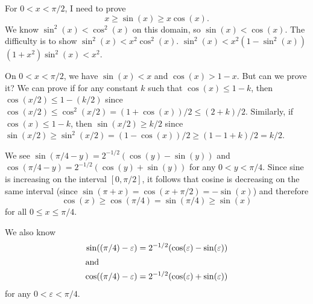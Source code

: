 For $0 < x < \pi/2$, I need to prove
\begin{equation}
x\geq \sin(x)\geq x\cos(x).
\end{equation}
We know $\sin^{2}(x) < \cos^{2}(x)$ on this domain, so $\sin(x) < \cos(x)$.
The difficulty is to show $\sin^{2}(x) < x^{2}\cos^{2}(x)$.
$\sin^{2}(x) < x^{2}(1 - \sin^{2}(x))$
$(1 + x^{2})\sin^{2}(x) < x^{2}$.

On $0 < x < \pi/2$, we have $\sin(x) < x$ and $\cos(x) > 1 - x$.
But can we prove it? We can prove if for any constant $k$ such that
$\cos(x)\leq 1 - k$, then $\cos(x/2)\leq 1 - (k/2)$ since
$\cos(x/2)\leq\cos^{2}(x/2) = (1 + \cos(x))/2 \leq (2 + k)/2$.
Similarly, if $\cos(x)\leq 1 - k$, then $\sin(x/2)\geq k/2$ since
$\sin(x/2)\geq\sin^{2}(x/2) = (1 - \cos(x))/2\geq (1 - 1 + k)/2 = k/2$.

We see $\sin(\pi/4 - y) = 2^{-1/2}(\cos(y) - \sin(y))$ and
$\cos(\pi/4 - y) = 2^{-1/2}(\cos(y) + \sin(y))$ for any $0<y<\pi/4$.
Since sine is increasing on the interval $[0,\pi/2]$, it follows that
cosine is decreasing on the same interval (since
$\sin(\pi + x) = \cos(x + \pi/2) = -\sin(x)$) and therefore
\begin{equation}
\cos(x)\geq\cos(\pi/4) = \sin(\pi/4)\geq\sin(x)
\end{equation}
for all $0\leq x\leq\pi/4$.

We also know
\begin{subequations}
\begin{align}
\sin((\pi/4) - \varepsilon) &= 2^{-1/2}(\cos(\varepsilon) - \sin(\varepsilon))\\
\intertext{and}
\cos((\pi/4) - \varepsilon) &= 2^{-1/2}(\cos(\varepsilon) + \sin(\varepsilon))
\end{align}
\end{subequations}
for any $0 < \varepsilon < \pi/4$.
